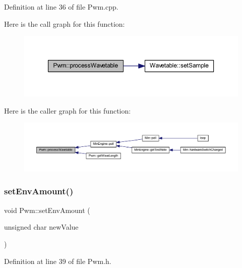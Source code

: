 Definition at line 36 of file Pwm.\+cpp.

Here is the call graph for this function\+:
\nopagebreak
\begin{figure}[H]
\begin{center}
\leavevmode
\includegraphics[width=350pt]{d6/df6/class_pwm_a51b2ea74a5b67115148141a843cddca1_cgraph}
\end{center}
\end{figure}
Here is the caller graph for this function\+:
\nopagebreak
\begin{figure}[H]
\begin{center}
\leavevmode
\includegraphics[width=350pt]{d6/df6/class_pwm_a51b2ea74a5b67115148141a843cddca1_icgraph}
\end{center}
\end{figure}
\mbox{\label{class_pwm_acda631e927e79a31dd2fc0e0116c88fc}} 
\subsubsection{\texorpdfstring{set\+Env\+Amount()}{setEnvAmount()}}
{\footnotesize\ttfamily void Pwm\+::set\+Env\+Amount (\begin{DoxyParamCaption}\item[{unsigned char}]{new\+Value }\end{DoxyParamCaption})\hspace{0.3cm}{\ttfamily [inline]}}



Definition at line 39 of file Pwm.\+h.

\mbox{\label{class_pwm_a1fe2ceb8636015244b4d3ed7ef15b333}} 
